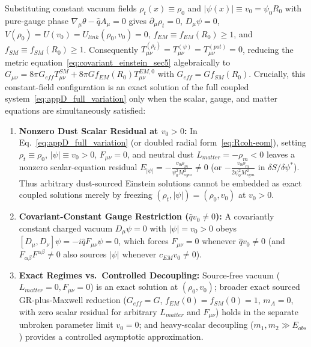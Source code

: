 \documentclass[american,11pt,letterpaper]{article}
\def\mathcal#1{#1}%
\def\mathrm#1{#1}%
\def\emph#1{#1}%
\begin{document}
Substituting constant vacuum fields $\rho_t(x) \equiv \rho_0$ and $|\psi(x)| \equiv v_0 = \psi_0 R_0$ with pure-gauge phase $\nabla_\mu\theta - \hat{q}A_\mu = 0$ gives $\partial_\mu\rho_t = 0$, $D_\mu\psi = 0$, $V(\rho_0) = U(v_0) = U_{\mathrm{link}}(\rho_0, v_0) = 0$, $f_{\mathrm{EM}} \equiv f_{\mathrm{EM}}(R_0) \ge 1$, and $f_{\mathrm{SM}} \equiv f_{\mathrm{SM}}(R_0) \ge 1$. Consequently $T_{\mu\nu}^{(\rho_t)} = T_{\mu\nu}^{(\psi)} = T_{\mu\nu}^{(\mathrm{pot})} = 0$, reducing the \emph{metric} equation~\eqref{eq:covariant_einstein_sec5} \emph{algebraically} to $G_{\mu\nu} = 8\pi G_{\mathrm{eff}} T_{\mu\nu}^{\mathrm{SM}} + 8\pi G f_{\mathrm{EM}}(R_0) T_{\mu\nu}^{\mathrm{EM},0}$ with $G_{\mathrm{eff}} = G f_{\mathrm{SM}}(R_0)$. Crucially, this constant-field configuration is an \emph{exact solution of the full coupled system}~\eqref{eq:appD_full_variation} only when the scalar, gauge, and matter equations are simultaneously satisfied:
\begin{enumerate}[leftmargin=2em]
  \item \textbf{Nonzero Dust Scalar Residual at $v_0 > 0$:} In Eq.~\eqref{eq:appD_full_variation} (or doubled radial form~\eqref{eq:Rcoh-eom}), setting $\rho_t \equiv \rho_0$, $|\psi| \equiv v_0 > 0$, $F_{\mu\nu} = 0$, and neutral dust $\mathcal{L}_{\mathrm{matter}} = -\rho_m < 0$ leaves a nonzero scalar-equation residual $\mathcal{E}_{|\psi|} = -\frac{v_0\rho_m}{\psi_0^2 M_{\mathrm{sym}}^2} \ne 0$ (or $-\frac{v_0\rho_m}{2\psi_0^2 M_{\mathrm{sym}}^2}$ in $\delta S/\delta\psi^*$). Thus arbitrary dust-sourced Einstein solutions cannot be embedded as exact coupled solutions merely by freezing $(\rho_t, |\psi|) = (\rho_0, v_0)$ at $v_0 > 0$.
  \item \textbf{Covariant-Constant Gauge Restriction ($\hat{q}v_0 \ne 0$):} A covariantly constant charged vacuum $D_\mu\psi = 0$ with $|\psi| = v_0 > 0$ obeys $[D_\mu, D_\nu]\psi = -i\hat{q}F_{\mu\nu}\psi = 0$, which forces $F_{\mu\nu} = 0$ whenever $\hat{q}v_0 \ne 0$ (and $F_{\alpha\beta}F^{\alpha\beta} \ne 0$ also sources $|\psi|$ whenever $c_{\mathrm{EM}} v_0 \ne 0$).
  \item \textbf{Exact Regimes vs.\ Controlled Decoupling:} Source-free vacuum ($\mathcal{L}_{\mathrm{matter}} = 0, F_{\mu\nu} = 0$) is an exact solution at $(\rho_0, v_0)$; broader exact sourced GR-plus-Maxwell reduction ($G_{\mathrm{eff}} = G$, $f_{\mathrm{EM}}(0) = f_{\mathrm{SM}}(0) = 1$, $m_A = 0$, with zero scalar residual for arbitrary $\mathcal{L}_{\mathrm{matter}}$ and $F_{\mu\nu}$) holds in the separate unbroken parameter limit $v_0 = 0$; and heavy-scalar decoupling ($m_1, m_2 \gg E_{\mathrm{obs}}$) provides a controlled asymptotic approximation.
\end{enumerate}
\end{document}
